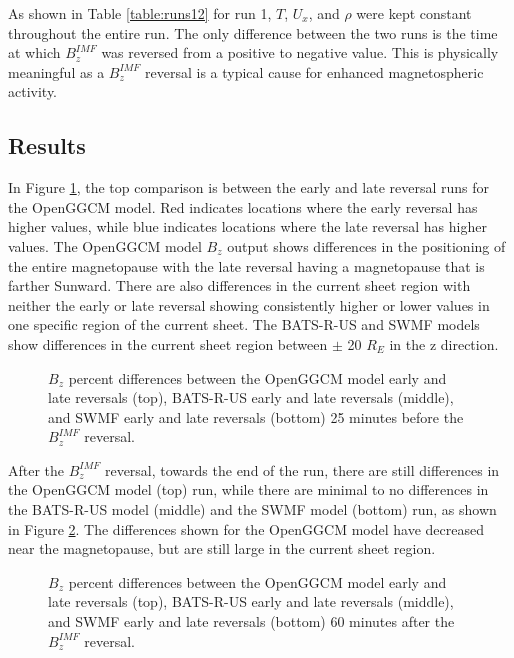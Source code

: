 As shown in Table \ref{table:runs12} for run 1, $T$, $U_x$, and $\rho$ were kept
constant throughout the entire run. The only difference between the two runs is
the time at which $B_z^{IMF}$ was reversed from a positive to negative value.
This is physically meaningful as a $B_z^{IMF}$ reversal is a typical cause for enhanced
magnetospheric activity.

\subsection{Results}	
In Figure \ref{fig:BdiffPCBeforeFlip}, the top comparison is between the early
and late reversal runs for the OpenGGCM model. Red indicates locations where
the early reversal has higher values, while blue indicates locations where the
late reversal has higher values. The OpenGGCM model $B_z$ output shows
differences in the positioning of the entire magnetopause with the late reversal
having a magnetopause that is farther Sunward. There are also differences in the
current sheet region with neither the early or late reversal showing
consistently higher or lower values in one specific region of the current sheet.
The BATS-R-US and SWMF models show differences in the current sheet region
between $\pm$ 20 $R_E$ in the z direction.

\begin{figure}
	\centering
	\caption{$B_z$ percent differences between the OpenGGCM model early and late
	reversals (top), BATS-R-US early and late reversals (middle), and SWMF early
	and late reversals (bottom) 25 minutes before the $B_z^{IMF}$ reversal.}
	\figSpace
	\label{fig:BdiffPCBeforeFlip}
\end{figure}

After the $B_z^{IMF}$ reversal, towards the end of the run, there are still
differences in the OpenGGCM model (top) run, while there are minimal to no
differences in the BATS-R-US model (middle) and the SWMF model (bottom) run, as
shown in Figure \ref{fig:BdiffPCAfterFlip}. The differences shown for the OpenGGCM model have
decreased near the magnetopause, but are still large in the current sheet
region.

\begin{figure}
	\centering
	\caption{$B_z$ percent differences between the OpenGGCM model early and late
	reversals (top), BATS-R-US early and late reversals (middle), and SWMF early
	and late reversals (bottom) 60 minutes after the $B_z^{IMF}$ reversal. }
	\figSpace
	\label{fig:BdiffPCAfterFlip}
\end{figure}

